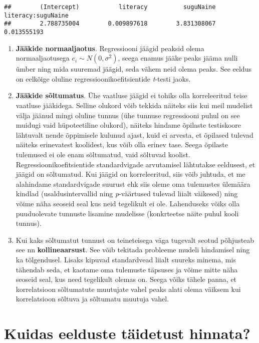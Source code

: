 \documentclass[
]{book}
\begin{document}
\begin{verbatim}
##        (Intercept)           literacy          suguNaine literacy:suguNaine 
##        2.788735004        0.009897618        3.831308067        0.013555193
\end{verbatim}

\begin{enumerate}
\def\labelenumi{\arabic{enumi}.}
\setcounter{enumi}{3}
\item
  \textbf{Jääkide normaaljaotus}. Regressiooni jäägid peaksid olema normaaljaotusega \(e_i \sim N(0, \sigma^2)\), seega enamus jääke peaks jääma nulli ümber ning mida suuremad jäägid, seda vähem neid olema peaks. See eeldus on eelkõige oluline regressioonikoefitsientide \emph{t}-testi jaoks.
\item
  \textbf{Jääkide sõltumatus}. Ühe vaatluse jäägid ei tohiks olla korreleeritud teise vaatluse jääkidega. Selline olukord võib tekkida näiteks siis kui meil mudelist välja jäänud mingi oluline tunnus (ühe tunnuse regressiooni puhul on see muidugi vaid hüpoteetiline olukord), näiteks hindame õpilaste testiskoore lähtuvalt nende õppimisele kulunud ajast, kuid ei arvesta, et õpilased tulevad näiteks erinevatest koolidest, kus võib olla erinev tase. Seega õpilaste tulemused ei ole enam sõltumatud, vaid sõltuvad koolist. Regressioonikoefitsientide standardvigade arvutamisel lähtutakse eeldusest, et jäägid on sõltumatud. Kui jäägid on korreleeritud, siis võib juhtuda, et me alahindame standardvigade suurust ehk siis oleme oma tulemustes ülemäära kindlad (usaldusintervallid ning \emph{p}-väärtused tulevad liialt väikesed) ning võime näha seoseid seal kus neid tegelikult ei ole. Lahenduseks võiks olla puuduolevate tunnuste lisamine mudelisse (konkrteetse näite puhul kooli tunnus).
\item
  Kui kaks sõltumatut tunnust on teineteisega väga tugevalt seotud põhjusteab see nn \textbf{kollineaarsust}. See võib tekitada probleeme mudeli hindamisel ning ka tõlgendusel. Lisaks kipuvad standardvead liialt suureks minema, mis tähendab seda, et kaotame oma tulemuste täpsuses ja võime mitte näha seoseid seal, kus need tegelikult olemas on. Seega võiks tähele panna, et korrelatsioon sõltumatute muutujate vahel peaks alati olema väiksem kui korrelatsioon sõltuva ja sõltumatu muutuja vahel.
\end{enumerate}

\hypertarget{kuidas-eelduste-tuxe4idetust-hinnata}{%
\section{Kuidas eelduste täidetust hinnata?}\label{kuidas-eelduste-tuxe4idetust-hinnata}}
\end{document}
